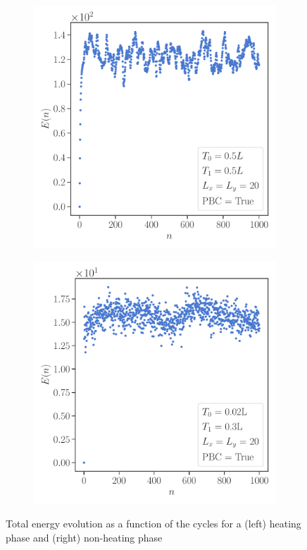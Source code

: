 \documentclass[11pt, a4paper, oneside]{book}
\theoremstyle{definition} %
\begin{document}
\begin{figure}[h]
\centering
\begin{subfigure}[t]{0.49\textwidth}
	\centering
	\includegraphics[width =\textwidth]{TotalEnergyHeating2d}
\end{subfigure}
\begin{subfigure}[t]{0.49\textwidth}
	\centering
	\includegraphics[width =\textwidth]{TotalEnergyNonHeating2d}
\end{subfigure}
\caption{Total energy evolution as a function of the cycles for a (left) heating phase and (right) non-heating phase}
\label{fig:Total_energy_evolution}
\end{figure}
\end{document}
